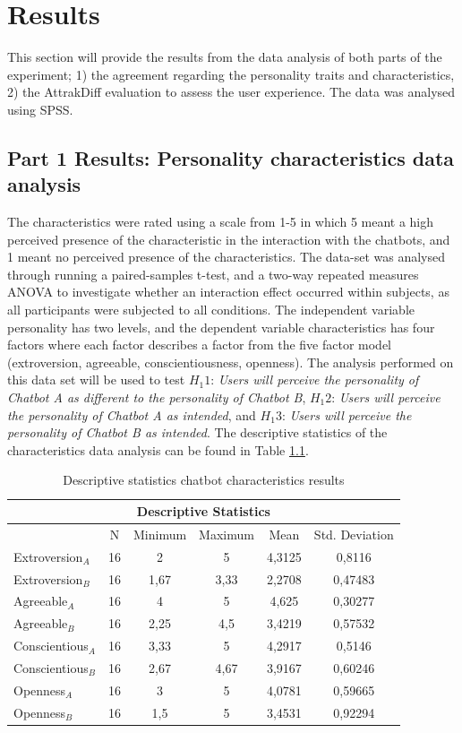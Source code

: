\chapter{Results}
\label{chap:results}

This section will provide the results from the data analysis of both parts of the experiment; 1) the agreement regarding the personality traits and characteristics, 2) the AttrakDiff evaluation to assess the user experience. The data was analysed using SPSS.

\section{Part 1 Results: Personality characteristics data analysis}

The characteristics were rated using a scale from 1-5 in which 5 meant a high perceived presence of the characteristic in the interaction with the chatbots, and 1 meant no perceived presence of the characteristics. The data-set was analysed through running a paired-samples t-test, and a two-way repeated measures ANOVA to investigate whether an interaction effect occurred within subjects, as all participants were subjected to all conditions. The independent variable personality has two levels, and the dependent variable characteristics has four factors where each factor describes a factor from the five factor model (extroversion, agreeable, conscientiousness, openness). The analysis performed on this data set will be used to test $H_1 1$: \textit{Users will perceive the personality of Chatbot A as different to the personality of Chatbot B}, $H_1 2$: \textit{Users will perceive the personality of Chatbot A as intended}, and $H_1 3$: \textit{Users will perceive the personality of Chatbot B as intended}. The descriptive statistics of the characteristics data analysis can be found in Table \ref{table:5}.

\begin{table}[h]
\centering
\begin{tabular}{lccccc}
\hline
\multicolumn{6}{c}{\textbf{Descriptive Statistics}} \\
\hline
& N & Minimum & Maximum & Mean & Std. Deviation \\
Extroversion$_A$ & 16 & 2 & 5 & 4,3125 & 0,8116 \\
Extroversion$_B$ & 16 & 1,67 & 3,33 & 2,2708 & 0,47483 \\
Agreeable$_A$ & 16 & 4 & 5 & 4,625 & 0,30277 \\
Agreeable$_B$ & 16 & 2,25 & 4,5 & 3,4219 & 0,57532 \\
Conscientious$_A$ & 16 & 3,33 & 5 & 4,2917 & 0,5146 \\
Conscientious$_B$ & 16 & 2,67 & 4,67 & 3,9167 & 0,60246 \\
Openness$_A$ & 16 & 3 & 5 & 4,0781 & 0,59665 \\
Openness$_B$ & 16 & 1,5 & 5 & 3,4531 & 0,92294 \\
\end{tabular}
 \caption{Descriptive statistics chatbot characteristics results}
 \label{table:5}
    \end{table}

